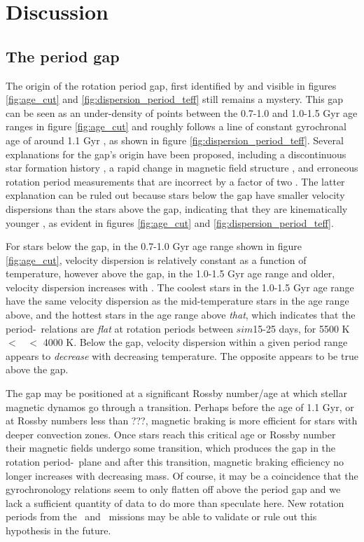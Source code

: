 \section{Discussion}
\label{sec:discussion}

\subsection{The period gap}
\label{sec:period_gap}

The origin of the rotation period gap, first identified
by \citet{mcquillan2013} and visible in figures \ref{fig:age_cut} and
\ref{fig:dispersion_period_teff} still remains a mystery.
This gap can be seen as an under-density of points between the 0.7-1.0 and
1.0-1.5 Gyr age ranges in figure \ref{fig:age_cut} and roughly follows a line
of constant gyrochronal age of around 1.1 Gyr \citep[according to the
gyrochronology relation of][]{angus2019}, as shown in figure
\ref{fig:dispersion_period_teff}.
Several explanations for the gap's origin have been proposed, including a
discontinuous star formation history \citep{mcquillan2013, davenport2017,
davenport2018}, a rapid change in magnetic field structure
\citep{reinhold2019}, and erroneous rotation period measurements that are
incorrect by a factor of two \citep{koen2018}.
The latter explanation can be ruled out because stars below the gap have
smaller velocity dispersions than the stars above the gap, indicating that
they are kinematically younger \citep{mcquillan2013, davenport2018}, as
evident in figures \ref{fig:age_cut} and \ref{fig:dispersion_period_teff}.

For stars below the gap, in the 0.7-1.0 Gyr age range shown in figure
\ref{fig:age_cut}, velocity dispersion is relatively constant as a function of
temperature, however above the gap, in the 1.0-1.5 Gyr age range and older,
velocity dispersion increases with \teff.
The coolest stars in the 1.0-1.5 Gyr age range have the same velocity
dispersion as the mid-temperature stars in the age range above, and the
hottest stars in the age range above {\it that}, which indicates that the
period-\teff\ relations are {\it flat} at rotation periods between $sim$15-25
days, for 5500 K $<$ \teff\ $<$ 4000 K.
Below the gap, velocity dispersion within a given period range appears to {\it
decrease} with decreasing temperature.
The opposite appears to be true above the gap.

The gap may be positioned at a significant Rossby number/age at which stellar
magnetic dynamos go through a transition.
Perhaps before the age of 1.1 Gyr, or at Rossby numbers less than ???,
magnetic braking is more efficient for stars with deeper convection zones.
Once stars reach this critical age or Rossby number their magnetic fields
undergo some transition, which produces the gap in the rotation period-\teff\
plane and after this transition, magnetic braking efficiency no longer
increases with decreasing mass.
Of course, it may be a coincidence that the gyrochronology relations seem to
only flatten off above the period gap and we lack a sufficient quantity of
data to do more than speculate here.
New rotation periods from the \ktwo\ and \tess\ missions may be able to
validate or rule out this hypothesis in the future.

